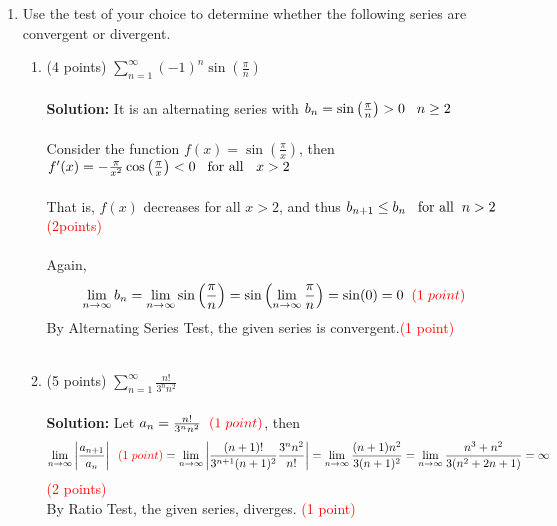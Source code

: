 \documentclass[paper=a4, fontsize=11pt]{scrartcl} %
\newcommand{\ds}{\displaystyle}
\numberwithin{equation}{section} %
\numberwithin{figure}{section} %
\numberwithin{table}{section} %
\begin{document}
\begin{enumerate}
\item  Use the test of your choice to determine whether the following series are convergent or divergent.
\begin{enumerate}
\item (4 points) $\sum\limits_{n=1}^\infty (-1)^n \sin \left( \frac{\pi}{n} \right)$\\\\
\textbf{Solution:} It is an alternating series with $b_n=\sin \left( \frac{\pi}{n} \right)>0\hspace{3mm}n\ge 2$\\\\
Consider the function $f(x)=\sin \left( \frac{\pi}{x} \right)$, then $f'(x)=-\frac{\pi}{x^2}\cos \left( \frac{\pi}{x} \right)<0\hspace{3mm}\text{for all }\hspace{2mm}x>2$\\\\
That is, $f(x)$ decreases for all $x>2$, and thus $b_{n+1}\le b_n\hspace{3mm}\text{for all}\hspace{2mm}n>2$\hspace{2mm1} \textcolor{red}{(2\hspace{1mm}points)}\\\\
Again, $$\lim\limits_{n\rightarrow\infty}b_n=\lim\limits_{n\rightarrow\infty}\sin \left( \frac{\pi}{n} \right)=\sin \left(\lim\limits_{n\rightarrow\infty} \frac{\pi}{n} \right)=\sin (0)=0\hspace{2mm}\textcolor{red}{(1\hspace{1mm} point)}$$
By Alternating Series Test, the given series is convergent.\hspace{2mm}\textcolor{red}{(1\hspace{1mm} point)}\\\\
\item (5 points) $\ds\sum_{n=1}^{\infty}\frac{n!}{3^nn^2}$\\\\
\textbf{Solution: } Let $a_n=\frac{n!}{3^nn^2}\hspace{2mm}\textcolor{red}{(1\hspace{1mm} point)}$, then
$$\lim\limits_{n\rightarrow\infty}\left|\frac{a_{n+1}}{a_n}\right|\hspace{2mm}\textcolor{red}{(1\hspace{1mm} point)}=\ds\lim\limits_{n\rightarrow\infty}\left|\frac{(n+1)!}{3^{n+1}(n+1)^2}\frac{3^nn^2}{n!}\right|=\ds\lim\limits_{n\rightarrow\infty}\ds\frac{(n+1)n^2}{3(n+1)^2}=\ds\lim\limits_{n\rightarrow\infty}\ds\frac{n^3+n^2}{3(n^2+2n+1)}=\infty$$
\hspace{2mm}\textcolor{red}{(2\hspace{1mm} points)}\\
By Ratio Test, the given series, diverges.
\hspace{2mm}\textcolor{red}{(1\hspace{1mm} point)}
\end{enumerate}


\end{enumerate}

\end{document}
